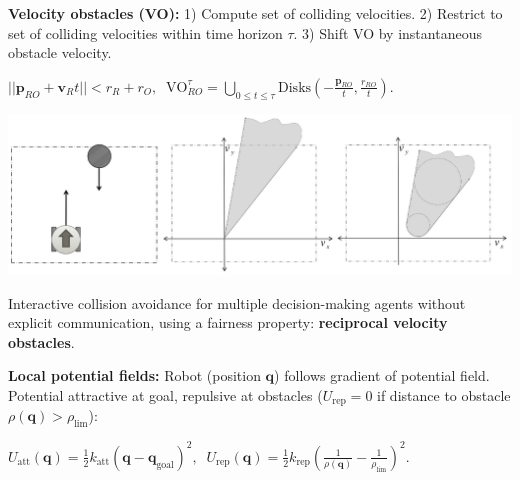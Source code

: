 \documentclass[landscape]{article}
\newcommand{\vmspace}{\vspace{-7pt}}
\newcommand{\vpspace}{\vspace{5pt}}
\begin{document}
\begin{multicols}{3}
\vpspace
\vpspace

\begin{minipage}{\columnwidth}
  \textbf{Velocity obstacles (VO):} 1) Compute set of colliding velocities. 2)
  Restrict to set of colliding velocities within time horizon $\tau$. 3) Shift
  VO by instantaneous obstacle velocity.
  \vmspace
  \begin{center}
    $
    || \mathbf p_{RO} + \mathbf v_R t || < r_R + r_O,\;\;
    \mathrm{VO}_{RO}^\tau = \bigcup\limits_{0 \le t \le \tau}
    \mathrm{Disks}\left(-\frac{\mathbf p_{RO}}{t}, \frac{r_{RO}}{t}\right).
    $
  \end{center}
  \vspace{-18pt}
  \includegraphics[width=\columnwidth]{img/12_VelocityObstacles.png}
\end{minipage}

\vpspace

\begin{minipage}{\columnwidth}
  Interactive collision avoidance for multiple decision-making agents without
  explicit communication, using a fairness property: \textbf{reciprocal velocity
  obstacles}.
\end{minipage}

\vpspace

\begin{minipage}{\columnwidth}
  \textbf{Local potential fields:} Robot (position $\mathbf q$) follows gradient
  of potential field. Potential attractive at goal, repulsive at obstacles
  ($U_\mathrm{rep} = 0$ if distance to obstacle $\rho(\mathbf q) >
  \rho_\mathrm{lim}$):
  \vmspace
  \begin{center}
    $
    U_\mathrm{att}(\mathbf q)
    =
    \frac{1}{2} k_\mathrm{att}(\mathbf q - \mathbf q_\mathrm{goal})^2,\;\;
    U_\mathrm{rep}(\mathbf q)
    =
    \frac{1}{2} k_\mathrm{rep} (\frac{1}{\rho(\mathbf q)}
    - \frac{1}{\rho_\mathrm{lim}})^2
    .
    $
  \end{center}
\end{minipage}

\vpspace


\end{multicols}
\end{document}
